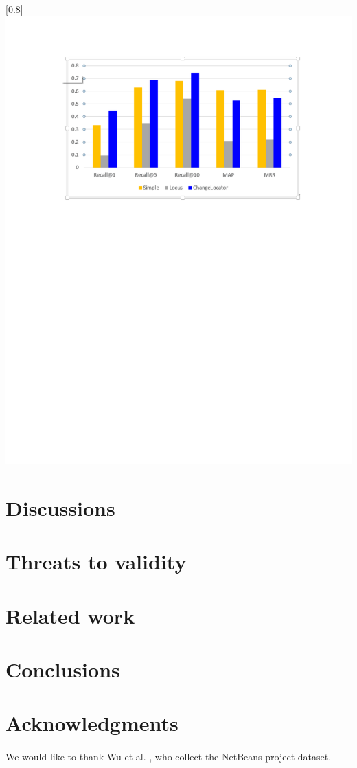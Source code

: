 \documentclass[a4paper]{article}
\begin{document}
\scalebox{0.8}[0.8]{\centering\includegraphics{compare.pdf}}

\section{Discussions}



\section{Threats to validity}



\section{Related work}



\section{Conclusions}


\section{Acknowledgments}
\paragraph{}
We would like to thank Wu et al.\cite{ChangeLocator} , who collect the NetBeans project dataset.




\end{document}
